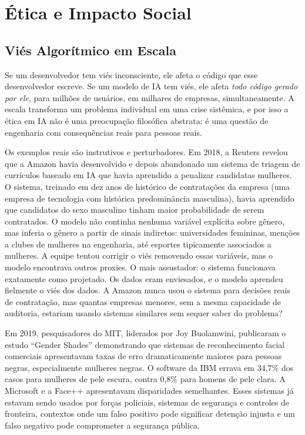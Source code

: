 \section{Ética e Impacto Social}

\subsection{Viés Algorítmico em Escala}

Se um desenvolvedor tem viés inconsciente, ele afeta o código que esse
desenvolvedor escreve. Se um modelo de IA tem viés, ele afeta
\textit{todo código gerado por ele}, para milhões de usuários, em
milhares de empresas, simultaneamente. A escala transforma um problema
individual em uma crise sistêmica, e por isso a ética em IA não
é uma preocupação filosófica abstrata: é uma questão de engenharia
com consequências reais para pessoas reais.

Os exemplos reais são instrutivos e perturbadores. Em 2018, a Reuters
revelou que a Amazon havia desenvolvido e depois abandonado um sistema
de triagem de currículos baseado em IA que havia aprendido a penalizar
candidatas mulheres. O sistema, treinado em dez anos de histórico de
contratações da empresa (uma empresa de tecnologia com histórica
predominância masculina), havia aprendido que candidatos do sexo
masculino tinham maior probabilidade de serem contratados. O modelo
não continha nenhuma variável explícita sobre gênero, mas inferia o
gênero a partir de sinais indiretos: universidades femininas, menções
a clubes de mulheres na engenharia, até esportes tipicamente
associados a mulheres. A equipe tentou corrigir o viés removendo essas
variáveis, mas o modelo encontrava outros proxies. O mais assustador:
o sistema funcionava exatamente como projetado. Os dados eram
enviesados, e o modelo aprendeu fielmente o viés dos dados. A Amazon
nunca usou o sistema para decisões reais de contratação, mas
quantas empresas menores, sem a mesma capacidade de auditoria, estariam
usando sistemas similares sem sequer saber do problema?

Em 2019, pesquisadores do MIT, liderados por Joy Buolamwini, publicaram
o estudo ``Gender Shades'' demonstrando que sistemas de reconhecimento
facial comerciais apresentavam taxas de erro dramaticamente maiores para
pessoas negras, especialmente mulheres negras. O software da IBM errava
em 34,7\% dos casos para mulheres de pele escura, contra 0,8\% para
homens de pele clara. A Microsoft e a Face++ apresentavam disparidades
semelhantes. Esses sistemas já estavam sendo usados por forças policiais,
sistemas de segurança e controles de fronteira, contextos onde um
falso positivo pode significar detenção injusta e um falso negativo pode
comprometer a segurança pública.

